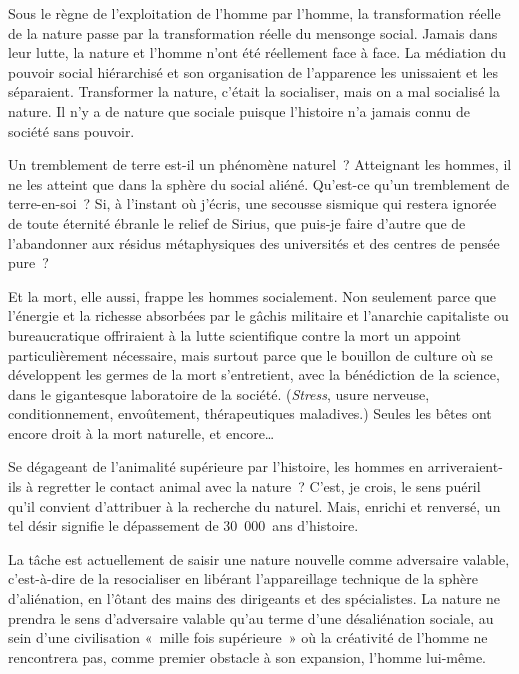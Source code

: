 \documentclass[french,twoside]{book} %
\newcommand{\astermono}{\medskip\centerline{\color{rubric}\large\selectfont{\syms ✻}}\medskip\par}%
\begin{document}
Sous le règne de l’exploitation de l’homme par l’homme, la transformation réelle de la nature passe par la transformation réelle du mensonge social. Jamais dans leur lutte, la nature et l’homme n’ont été réellement face à face. La médiation du pouvoir social hiérarchisé et son organisation de l’apparence les unissaient et les séparaient. Transformer la nature, c’était la socialiser, mais on a mal socialisé la nature. Il n’y a de nature que sociale puisque l’histoire n’a jamais connu de société sans pouvoir.\par
Un tremblement de terre est-il un phénomène naturel ? Atteignant les hommes, il ne les atteint que dans la sphère du social aliéné. Qu’est-ce qu’un tremblement de terre-en-soi ? Si, à l’instant où j’écris, une secousse sismique qui restera ignorée de toute éternité ébranle le relief de Sirius, que puis-je faire d’autre que de l’abandonner aux résidus métaphysiques des universités et des centres de pensée pure ?\par
Et la mort, elle aussi, frappe les hommes socialement. Non seulement parce que l’énergie et la richesse absorbées par le gâchis militaire et l’anarchie capitaliste ou bureaucratique offriraient à la lutte scientifique contre la mort un appoint particulièrement nécessaire, mais surtout parce que le bouillon de culture où se développent les germes de la mort s’entretient, avec la bénédiction de la science, dans le gigantesque laboratoire de la société. (\emph{Stress}, usure nerveuse, conditionnement, envoûtement, thérapeutiques maladives.) Seules les bêtes ont encore droit à la mort naturelle, et encore…\par
Se dégageant de l’animalité supérieure par l’histoire, les hommes en arriveraient-ils à regretter le contact animal avec la nature ? C’est, je crois, le sens puéril qu’il convient d’attribuer à la recherche du naturel. Mais, enrichi et renversé, un tel désir signifie le dépassement de 30 000 ans d’histoire.\par
La tâche est actuellement de saisir une nature nouvelle comme adversaire valable, c’est-à-dire de la resocialiser en libérant l’appareillage technique de la sphère d’aliénation, en l’ôtant des mains des dirigeants et des spécialistes. La nature ne prendra le sens d’adversaire valable qu’au terme d’une désaliénation sociale, au sein d’une civilisation « mille fois supérieure » où la créativité de l’homme ne rencontrera pas, comme premier obstacle à son expansion, l’homme lui-même.\par

\astermono
\end{document}
